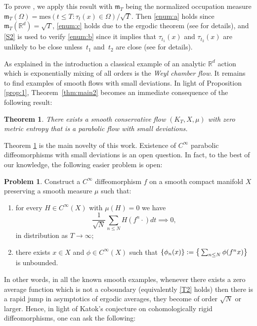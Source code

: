 \documentclass[JEP,XML,SOM,Unicode,NoFloatCountersInSection]{cedram}
\let\DS\relax
\newcommand\reals{\mathbb{R}}\let\R\reals
\newcommand\fm{\mathfrak{m}}
\newcommand\mes{\mathrm{mes}}
\theoremstyle{definition}
\newtheorem{problem}[definition]{Problem}
\theoremstyle{plain}
\newtheorem{Main}{Theorem}
\begin{document}
To prove \cite[Th.\,3.2]{DDKN}, we apply this result with $\fm_T$ being the normalized occupation measure $\fm_T(\Omega)=\mes(t\leq T: \tau_t(x)\in \Omega)/\sqrt{T}$.
Then \eqref{enum:a} holds since $\fm_T(\reals^d)=\sqrt{T}$, \eqref{enum:c} holds due to the ergodic theorem
(see \cite[\S 5.1.2]{DDKN} for details),
and
\eqref{S2} is used to verify \eqref{enum:b} since it implies that $\tau_{t_1}(x)$ and $\tau_{t_2}(x)$ are
unlikely to be close unless~$t_1$ and~$t_2$ are close (see \cite[\S 5.1.2]{DDKN} for details).

As explained in the introduction a classical example of an analytic $\R^d$ action which is exponentially mixing of all orders is the \emph{Weyl chamber flow}. It remains to find examples of smooth flows with small deviations.
In light of Proposition \ref{prop:1}, Theorem~\ref{thm:main2} becomes an immediate consequence of the following result:

\begin{Main}\label{thm:SP} There exists a smooth conservative flow $(K_T,X,\mu)$ with zero metric entropy that is a parabolic flow with small deviations.
\end{Main}

Theorem \ref{thm:SP} is the main novelty of this work. Existence of $C^\infty$ parabolic diffeomorphisms with small deviations is an open question. In fact, to the best of our knowledge, the following easier problem is open:
\begin{problem} Construct a $C^\infty$ diffeomorphism $f$ on a smooth compact manifold $X$ preserving a smooth measure $\mu$ such that:
\begin{enumerate}\renewcommand{\theenumi}{\textup{T}\arabic{enumi}}
\item\label{T1}
for every $H\in C^\infty (X)$ with $\mu(H)=0$ we have\vspace*{-3pt}
\[
\frac{1}{\sqrt{N}}\sum_{n\leq N} H(f^n \cdot )dt\implies 0,
\]
in distribution as $T\to\infty$;
\item\label{T2}
there exists $x\in X$ and $\phi\in C^\infty(X)$ such that
$\DS
\{\phi_n(x)\}:=\big\{\sum_{n\leq N} \phi(f^nx)\big\} $
is unbounded.
\end{enumerate}
\end{problem}

In other words, in all the known smooth examples, whenever there exists a zero average function which is not a coboundary (equivalently \eqref{T2} holds) then there is a rapid jump in asymptotics of ergodic averages, \ie they become of order $\sqrt{N}$ or larger. Hence, in light of Katok's conjecture on cohomologically rigid diffeomorphisms, one can ask the following:
\end{document}
